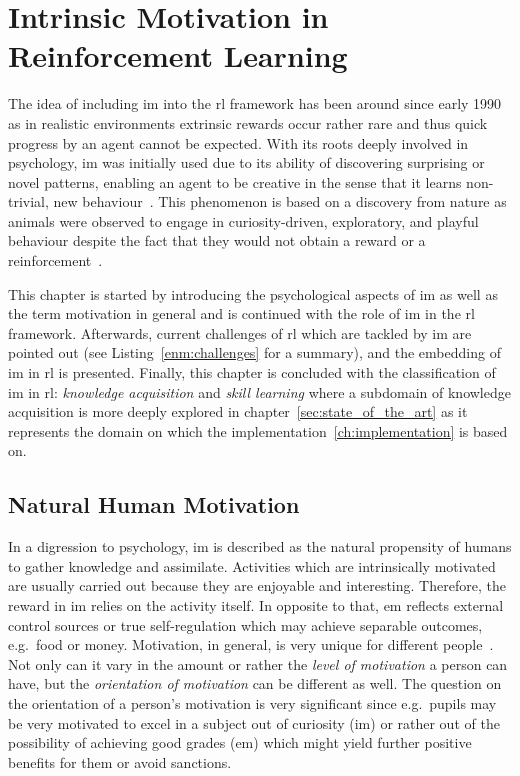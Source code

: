 \documentclass[draft,final]{vutinfth} %
\begin{document}
    \chapter{Intrinsic Motivation in Reinforcement Learning}\label{ch:intrinsic-motivation-in-reinforcement-learning}
    The idea of including \gls{im} into the \gls{rl} framework has been around since early 1990 as in realistic environments extrinsic rewards occur rather rare and thus quick progress by an agent cannot be expected.
    With its roots deeply involved in psychology, \gls{im} was initially used due to its ability of discovering surprising or novel patterns, enabling an agent to be creative in the sense that it learns non-trivial, new behaviour~\citep{schmidhuber_formal_2010}.
    This phenomenon is based on a discovery from nature as animals were observed to engage in curiosity-driven, exploratory, and playful behaviour despite the fact that they would not obtain a reward or a reinforcement~\citep{white_motivation_1959}.

    This chapter is started by introducing the psychological aspects of \gls{im} as well as the term motivation in general and is continued with the role of \gls{im} in the \gls{rl} framework.
    Afterwards, current challenges of \gls{rl} which are tackled by \gls{im} are pointed out (see Listing~\ref{enm:challenges} for a summary), and the embedding of \gls{im} in \gls{rl} is presented.
    Finally, this chapter is concluded with the classification of \gls{im} in \gls{rl}: \textit{knowledge acquisition} and \textit{skill learning} where a subdomain of knowledge acquisition is more deeply explored in chapter~\ref{sec:state_of_the_art} as it represents the domain on which the implementation~\eqref{ch:implementation} is based on.


    \section{Natural Human Motivation}

    In a digression to psychology, \gls{im} is described as the natural propensity of humans to gather knowledge and assimilate.
    Activities which are intrinsically motivated are usually carried out because they are enjoyable and interesting.
    Therefore, the reward in \gls{im} relies on the activity itself.
    In opposite to that, \gls{em} reflects external control sources or true self-regulation which may achieve separable outcomes, e.g.\ food or money.
    Motivation, in general, is very unique for different people~\citep{ryan_intrinsic_2000}.
    Not only can it vary in the amount or rather the \textit{level of motivation} a person can have, but the \textit{orientation of motivation} can be different as well.
    The question on the orientation of a person's motivation is very significant since e.g.\ pupils may be very motivated to excel in a subject out of curiosity (\gls{im}) or rather out of the possibility of achieving good grades (\gls{em}) which might yield further positive benefits for them or avoid sanctions.
\end{document}
